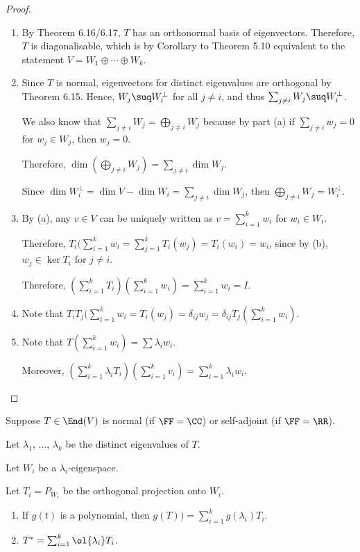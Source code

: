 \documentclass[11pt]{scrartcl}
\begin{document}
\begin{proof}
  \hfill

  \begin{enumerate}[label=\alph*)]
  \item By Theorem 6.16/6.17, $T$ has an orthonormal basis of eigenvectors. Therefore, $T$ is diagonalisable, which is by Corollary to Theorem 5.10 equivalent to the statement $V = W_1\oplus \cdots \oplus W_k$.
  \item Since $T$ is normal, eigenvectors for distinct eigenvalues are
    orthogonal by Theorem 6.15. Hence, $W_j\suq W_i^{\bot}$ for all $j\neq i$, and thus $\sum_{j\neq i} W_j \suq W_i^{\bot}$.

    We also know that $\sum_{j\neq i} W_j = \bigoplus_{j\neq i} W_j$
    because by part (a) if $\sum_{j\neq i}w_j = 0$ for $w_j\in W_j$,
    then $w_j = 0$.

    Therefore, $\dim(\bigoplus_{j\neq i}W_j) = \sum_{j\neq i}\dim W_j$.

    Since
    $\dim W_i^{\bot} = \dim V - \dim W_i = \sum_{j\neq i}\dim W_j$,
    then $\bigoplus_{j\neq i} W_j = W_i^{\bot}$.

  \item By (a), any $v\in V$ can be uniquely written as $v = \sum_{i=1}^k w_i$
    for $w_i\in W_i$.

    Therefore,
    $T_i(\sum_{i=1}^k w_i = \sum_{j=1}^kT_i(w_{j}) = T_i(w_i) =
    w_{i}$, since by (b), $w_{j}\in \ker T_i$ for $j\neq i$.

    Therefore, $(\sum_{i=1}^k T_{i})(\sum_{i=1}^kw_i)= \sum_{i=1}^kw_i = I$.
    
  \item Note that $T_{i} T_j(\sum_{i=1}^kw_i = T_i(w_j) = \delta_{ij}w_j = \delta_{ij}T_j(\sum_{i=1}^kw_i)$.
  \item Note that $T(\sum_{i=1}^k w_i) = \sum \lambda_iw_i$.

    Moreover, $(\sum_{i=1}^k\lambda_iT_i)(\sum_{i=1}^kv_i) = \sum_{i=1}^k\lambda_iw_i$.
  \end{enumerate}
\end{proof}

\begin{lemma}
\label{sec:spectr-theor-revis-1}
  Suppose $T \in \End(V)$ is normal (if $\FF = \CC$) or self-adjoint
  (if $\FF = \RR$).

  Let $\lambda_1$, $\dots$, $\lambda_k$ be the distinct eigenvalues of
  $T$.

  Let $W_i$ be a $\lambda_i$-eigenspace.

  Let $T_i = P_{W_i}$ be the orthogonal projection onto $W_i$.

  \begin{enumerate}[label=\alph*)]
  \item  If $g(t)$ is a polynomial, then $g(T)) = \sum_{i=1}^kg(\lambda_i)T_i$.
  \item $T^{*}= \sum_{i=1}^k\ol{\lambda_i}T_{i}$.
  \end{enumerate}
\end{lemma}
\end{document}
